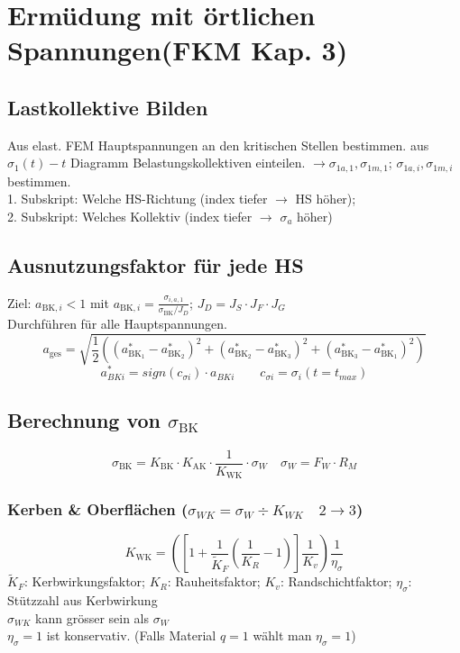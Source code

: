 \section{Ermüdung mit örtlichen Spannungen(FKM Kap. 3)}
    \subsection{Lastkollektive Bilden}
    Aus elast. FEM Hauptspannungen an den kritischen Stellen bestimmen.
    aus $\sigma_1(t)-t$ Diagramm Belastungskollektiven einteilen. $\rightarrow \sigma_{1a,1}, \sigma_{1m,1}$; $\sigma_{1a,i}, \sigma_{1m,i}$ bestimmen.
    \\1. Subskript: Welche HS-Richtung (index tiefer $\rightarrow$ HS höher);
    \\2. Subskript: Welches Kollektiv (index tiefer $\rightarrow$ $\sigma_a$ höher)
    \subsection{Ausnutzungsfaktor für jede HS}
        Ziel: $a_{\textrm{BK},i} < 1$ mit $\displaystyle a_{\textrm{BK},i} = \frac{\sigma_{i,a,1}}{\sigma_{\textrm{BK}}/J_D}$; \quad $J_D=J_S\cdot J_F \cdot J_G$
        \\Durchführen für alle Hauptspannungen.
        \[a_{\textrm{ges}}=\sqrt{\frac{1}{2}\left((a_{\textrm{BK}_1}^{*}-a_{\textrm{BK}_2}^{*})^{2}+(a_{\textrm{BK}_2}^{*}-a_{\textrm{BK}_3}^{*})^{2}+(a_{\textrm{BK}_3}^{*}-a_{\textrm{BK}_1}^{*})^{2}\right)}\]
        \[a_{BKi}^*=sign(c_{\sigma i})\cdot a_{BKi} \qquad c_{\sigma i}= \sigma_i(t=t_{max})\]
    \subsection{Berechnung von $\sigma_{\textrm{BK}}$}
        \[\boxed{\sigma_{\textrm{BK}} = K_{\textrm{BK}} \cdot K_{\textrm{AK}} \cdot \frac{1}{K_{\textrm{WK}}} \cdot \sigma_W }\quad \sigma_W = F_W \cdot R_M\]
	\subsubsection{Kerben \& Oberflächen ($\sigma_{WK}=\sigma_W \div K_{WK}\quad2\rightarrow3$)}
            \[\boxed{K_{\textrm{WK}}=\left(\left[1+\frac{1}{\widetilde{K}_F}\left(\frac{1}{K_R}-1\right)\right]\frac{1}{K_v}\right)\frac{1}{\eta_{\sigma}}}\]
            $\widetilde{K}_F$: Kerbwirkungsfaktor;   $K_R$: Rauheitsfaktor;     $K_v$: Randschichtfaktor;   $\eta_{\sigma}$: Stützzahl aus Kerbwirkung
            \\$\sigma_{WK}$ kann grösser sein als $\sigma_W$
            \\$\eta_{\sigma}=1$ ist konservativ. (Falls Material $q=1$ wählt man $\eta_{\sigma}=1$)
